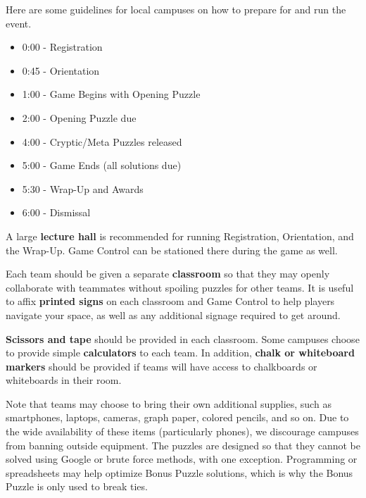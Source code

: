 
Here are some guidelines for local campuses on how to prepare for and
run the event.


\begin{itemize}
  \item 0:00 - Registration
  \item 0:45 - Orientation
  \item 1:00 - Game Begins with Opening Puzzle
  \item 2:00 - Opening Puzzle due
  \item 4:00 - Cryptic/Meta Puzzles released
  \item 5:00 - Game Ends (all solutions due)
  \item 5:30 - Wrap-Up and Awards
  \item 6:00 - Dismissal
\end{itemize}


A large \textbf{lecture hall} is recommended for running Registration,
Orientation, and the Wrap-Up. Game Control can be stationed there during
the game as well.

Each team should be given a separate \textbf{classroom} so that they may
openly collaborate with teammates without spoiling puzzles for other teams.
It is useful to affix \textbf{printed signs} on each classroom and Game
Control to help players navigate your space, as well as any additional
signage required to get around.


\textbf{Scissors and tape} should be provided in each classroom.
Some campuses choose to provide simple \textbf{calculators} to each team.
In addition, \textbf{chalk or whiteboard markers} should be provided if
teams will have access to chalkboards or whiteboards in their room.

Note that teams may choose to bring their own additional supplies, such as
smartphones, laptops, cameras, graph paper, colored pencils, and so on. Due to
the wide availability of these items (particularly phones), we discourage
campuses from banning outside equipment. The puzzles are designed so that they
cannot be solved using Google or brute force methods, with one exception.
Programming or spreadsheets may help optimize Bonus Puzzle solutions, which is
why the Bonus Puzzle is only used to break ties.

